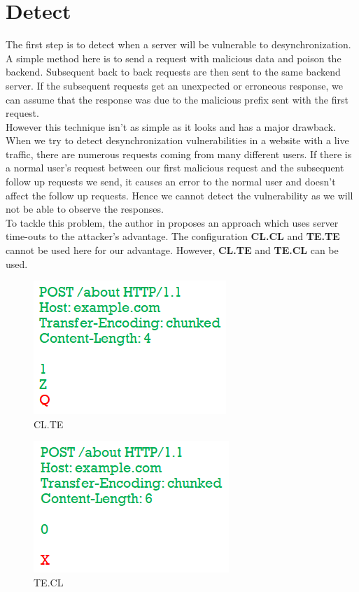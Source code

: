 \section{Detect}
The first step is to detect when a server will be vulnerable to desynchronization. A simple method here is to send a request with malicious data and poison the backend. Subsequent back to back requests are then sent to the same backend server. If the subsequent requests get an unexpected or erroneous response, we can assume that the response was due to the malicious prefix sent with the first request.  \\
However this technique isn't as simple as it looks and has a major drawback. When we try to detect desynchronization vulnerabilities in a website with a live traffic, there are numerous requests coming from many different users. If there is a normal user's request between our first malicious request and the subsequent follow up requests we send, it causes an error to the normal user and doesn't affect the follow up requests. Hence we cannot detect the vulnerability as we will not be able to observe the responses. \\
To tackle this problem, the author in \cite{b6} proposes an approach which uses server time-outs to the attacker's advantage. The configuration \textbf{CL.CL} and \textbf{TE.TE} cannot be used here for our advantage. However, \textbf{CL.TE} and \textbf{TE.CL} can be used. \\

\begin{figure}
	\includegraphics{images/CL.TE}
	\caption{CL.TE}
	\label{fig:CL.TE}
\end{figure}

\begin{figure}
	\includegraphics{images/TE.CL}
	\caption{TE.CL}
	\label{fig:TE.CL}
\end{figure}

